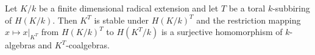 Let $K/k$ be a finite dimensional radical extension and let $T$ be a toral $k$-subbiring of $H(K/k)$. Then $K^T$ is stable under $H(K/k)^T$ and the restriction mapping $x \mapsto x|_{K^T}$ from $H(K/k)^T$ to $H(K^T/k)$ is a surjective homomorphism of $k$-algebras and $K^T$-coalgebras.
